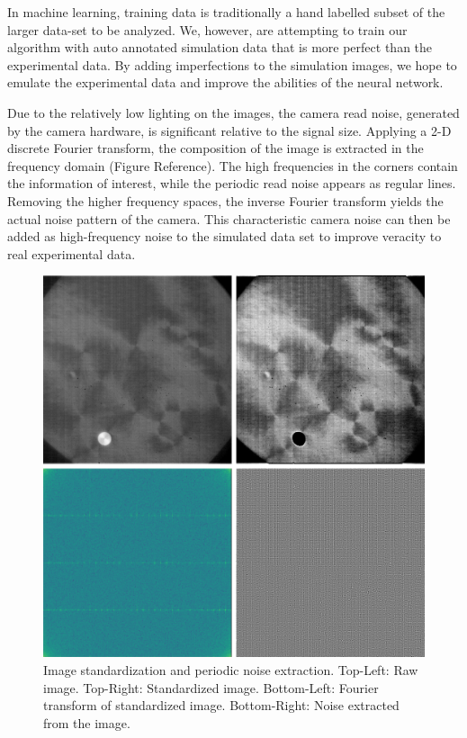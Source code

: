 \documentclass[prl,reprint,showpacs,floatfix,nofootinbib]{revtex4-1}
\begin{document}
In machine learning, training data is traditionally a hand labelled subset of the larger data-set to be analyzed. We, however, are attempting to train our algorithm with auto annotated simulation data that is more perfect than the experimental data. By adding imperfections to the simulation images, we hope to emulate the experimental data and improve the abilities of the neural network.

Due to the relatively low lighting on the images, the camera read noise, generated by the camera hardware, is significant relative to the signal size. Applying a 2-D discrete Fourier transform, the composition of the image is extracted in the frequency domain (Figure Reference). The high frequencies in the corners contain the information of interest, while the periodic read noise appears as regular lines. Removing the higher frequency spaces, the inverse Fourier transform yields the actual noise pattern of the camera. This characteristic camera noise can then be added as high-frequency noise to the simulated data set to improve veracity to real experimental data.

\begin{figure}
  \includegraphics[width=\linewidth]{Standardizationandnoise.png}
  \caption{Image standardization and periodic noise extraction. Top-Left: Raw image. Top-Right: Standardized image. Bottom-Left: Fourier transform of standardized image. Bottom-Right: Noise extracted from the image.}
  \label{fig:Standardization and Noise}
\end{figure}
\end{document}
